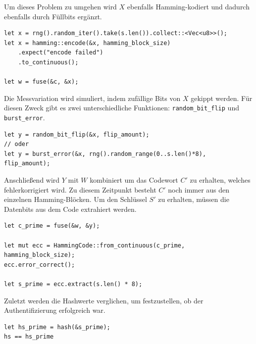 \documentclass{article}
\begin{document}
    Um dieses Problem zu umgehen wird $X$ ebenfalls Hamming-kodiert und dadurch ebenfalls durch Füllbits ergänzt.
    \begin{verbatim}
let x = rng().random_iter().take(s.len()).collect::<Vec<u8>>();
let x = hamming::encode(&x, hamming_block_size)
    .expect("encode failed")
    .to_continuous();

let w = fuse(&c, &x);
    \end{verbatim}
    Die Messvariation wird simuliert, indem zufällige Bits von $X$ gekippt werden. Für diesen Zweck gibt es zwei unterschiedliche
    Funktionen: \verb|random_bit_flip| und \verb|burst_error|.
    \begin{verbatim}
let y = random_bit_flip(&x, flip_amount);
// oder
let y = burst_error(&x, rng().random_range(0..s.len()*8), flip_amount);
    \end{verbatim}
    Anschließend wird $Y$ mit $W$ kombiniert um das Codewort $C'$ zu erhalten, welches fehlerkorrigiert wird. Zu diesem Zeitpunkt
    besteht $C'$ noch immer aus den einzelnen Hamming-Blöcken. Um den Schlüssel $S'$ zu erhalten, müssen die Datenbits aus dem
    Code extrahiert werden.
    \begin{verbatim}
let c_prime = fuse(&w, &y);

let mut ecc = HammingCode::from_continuous(c_prime, hamming_block_size);
ecc.error_correct();

let s_prime = ecc.extract(s.len() * 8);
    \end{verbatim}
    Zuletzt werden die Hashwerte verglichen, um festzustellen, ob der Authentifizierung erfolgreich war.
    \begin{verbatim}
let hs_prime = hash(&s_prime);
hs == hs_prime
    \end{verbatim}\vspace*{-1em}
\end{document}
